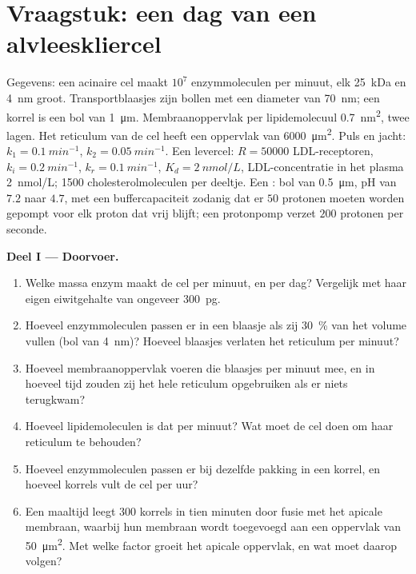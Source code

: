 \section{Vraagstuk: een dag van een alvleeskliercel}

\begin{problem}
\label{pb:b3:membrane-traffic:1}
Gegevens: een acinaire cel maakt $10^{7}$ enzymmoleculen per minuut,
elk \qty{25}{kDa} en \qty{4}{nm} groot. Transportblaasjes zijn bollen
met een diameter van \qty{70}{nm}; een korrel is een bol van
\qty{1}{\micro m}. Membraanoppervlak per lipidemolecuul
\qty{0.7}{nm^2}, twee lagen. Het reticulum van de cel heeft een
oppervlak van \qty{6000}{\micro m^2}. Puls en jacht:
$k_{1} = \qty{0.1}{min^{-1}}$, $k_{2} = \qty{0.05}{min^{-1}}$. Een
levercel: $R = \num{50000}$ LDL-receptoren, $k_{i} = \qty{0.2}{min^{-1}}$,
$k_{r} = \qty{0.1}{min^{-1}}$, $K_{d} = \qty{2}{nmol/L}$, LDL-concentratie
in het plasma \qty{2}{nmol/L}; \num{1500} cholesterolmoleculen
per deeltje.
Een : bol van \qty{0.5}{\micro m}, pH van $7.2$ naar $4.7$, met
een buffercapaciteit zodanig dat er $50$ protonen moeten worden gepompt
voor elk proton dat vrij blijft; een protonpomp verzet $200$ protonen
per seconde.

\medskip
\noindent\textbf{Deel I --- Doorvoer.}
\begin{enumerate}
  \item Welke massa enzym maakt de cel per minuut, en per dag?
        Vergelijk met haar eigen eiwitgehalte van ongeveer
        \qty{300}{pg}.
  \item Hoeveel enzymmoleculen passen er in een blaasje als zij
        \qty{30}{\%} van het volume vullen (bol van \qty{4}{nm})?
        Hoeveel blaasjes verlaten het reticulum per minuut?
  \item Hoeveel membraanoppervlak voeren die blaasjes per minuut mee,
        en in hoeveel tijd zouden zij het hele reticulum opgebruiken
        als er niets terugkwam?
  \item Hoeveel lipidemoleculen is dat per minuut? Wat moet de cel doen
        om haar reticulum te behouden?
  \item Hoeveel enzymmoleculen passen er bij dezelfde pakking in een
        korrel, en hoeveel korrels vult de cel per uur?
  \item Een maaltijd leegt $300$ korrels in tien minuten door fusie met
        het apicale membraan, waarbij hun membraan wordt toegevoegd aan
        een oppervlak van \qty{50}{\micro m^2}. Met welke factor groeit
        het apicale oppervlak, en wat moet daarop volgen?
\end{enumerate}


\end{problem}
